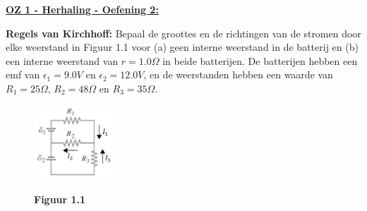 \textbf{\underline{OZ 1 - Herhaling - Oefening 2:}}
\vspace{0.5cm}

\textbf{Regels van Kirchhoff:} Bepaal de groottes en de richtingen van de stromen door elke weerstand in Figuur 1.1 voor (a) geen interne weerstand in de batterij en (b) een interne weerstand van $ r = 1.0 \Omega $ in beide batterijen. De batterijen hebben een emf van $ \epsilon_1 = 9.0 V $ en $ \epsilon_2 = 12.0 V $, en de weerstanden hebben een waarde van $ R_1 = 25 \Omega $, $ R_2 = 48 \Omega $ en $ R_3 = 35 \Omega $.

\begin{figure}[H]
    \centering
    \includegraphics[width=3cm]{oz01/herhaling/resources/oef-2-opgave+schets.png}
    
    \textbf{Figuur 1.1}
\end{figure}

